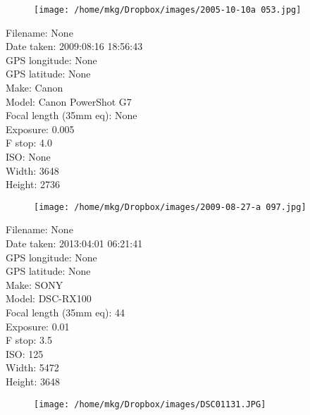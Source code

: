 \clearpage
\recalctypearea
\newpage
\noindent
\begin{figure}
    \texttt{[image: /home/mkg/Dropbox/images/2005-10-10a 053.jpg]}
\end{figure}

\clearpage
\recalctypearea
\newpage
\noindent
Filename: None\\ 
Date taken: 2009:08:16 18:56:43\\ 
GPS longitude: None\\ 
GPS latitude: None\\ 
Make: Canon\\ 
Model: Canon PowerShot G7\\ 
Focal length (35mm eq): None\\ 
Exposure: 0.005\\ 
F stop: 4.0\\ 
ISO: None\\ 
Width: 3648\\ 
Height: 2736\\ 

\clearpage
\recalctypearea
\newpage
\noindent
\begin{figure}
    \texttt{[image: /home/mkg/Dropbox/images/2009-08-27-a 097.jpg]}
    \captionlistentry[figure]{\url{\protect\detokenize{}}}
\end{figure}

\clearpage
\recalctypearea
\newpage
\noindent
Filename: None\\ 
Date taken: 2013:04:01 06:21:41\\ 
GPS longitude: None\\ 
GPS latitude: None\\ 
Make: SONY\\ 
Model: DSC-RX100\\ 
Focal length (35mm eq): 44\\ 
Exposure: 0.01\\ 
F stop: 3.5\\ 
ISO: 125\\ 
Width: 5472\\ 
Height: 3648\\ 

\clearpage
\recalctypearea
\newpage
\noindent
\begin{figure}
    \texttt{[image: /home/mkg/Dropbox/images/DSC01131.JPG]}
    \captionlistentry[figure]{\url{\protect\detokenize{}}}
\end{figure}

